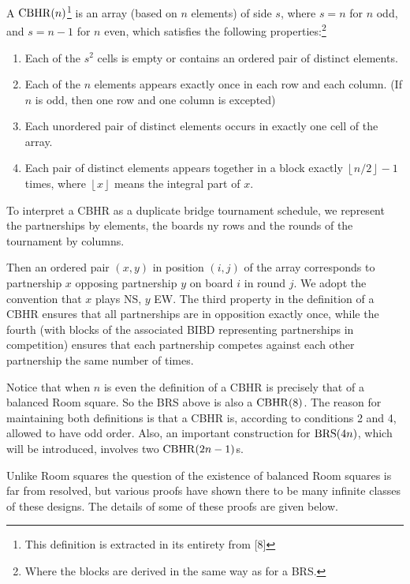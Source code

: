 A  $\operatorname{CBHR}(n)$\footnote{This definition is extracted in its entirety from [8]} is an array (based on $n$ elements) of side $s$, where $s = n$ for $n$ odd, and $s = n-1$ for $n$ even, which satisfies the following properties:\footnote{Where the blocks are derived in the same way as for a BRS.}
\begin{enumerate}
  \item{Each of the $s^2$ cells is empty or contains an ordered
    pair of distinct elements.}
  \item{Each of the $n$ elements appears exactly once in each
    row and each column. (If $n$ is odd, then one row and
    one column is excepted)}
  \item{Each unordered pair of distinct elements occurs in
    exactly one cell of the array.}
  \item{Each pair of distinct elements appears together in a
    block exactly $\left \lfloor{n/2}\right \rfloor -1$
    times, where $\left \lfloor{x}\right \rfloor$ means the
    integral part of $x$.}
\end{enumerate}

To interpret a CBHR as a duplicate bridge tournament schedule, we represent the partnerships by elements, the boards ny rows and the rounds of the tournament by columns.

Then an ordered pair $(x, y)$ in position $(i, j)$ of the array corresponds to partnership $x$ opposing partnership $y$ on board $i$ in round $j$.
We adopt the convention that $x$ plays NS, $y$ EW.
The third property in the definition of a CBHR ensures that all partnerships are in opposition exactly once, while the fourth (with blocks of the associated BIBD representing partnerships in competition) ensures that each partnership competes against each other partnership the same number of times.

Notice that when $n$ is even the definition of a CBHR is precisely that of a balanced Room square.
So the BRS above is also a $\operatorname{CBHR}(8)$.
The reason for maintaining both definitions is that a CBHR is, according to conditions 2 and 4, allowed to have odd order.
Also, an important construction for $\operatorname{BRS}(4n)$, which will be introduced, involves two $\operatorname{CBHR}(2n - 1)$s.

Unlike Room squares the question of the existence of balanced Room squares is far from resolved, but various proofs have shown there to be many infinite classes of these designs.
The details of some of these proofs are given below.

